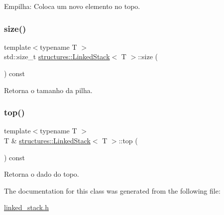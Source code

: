 Empilha\+: Coloca um novo elemento no topo. 

\mbox{\label{classstructures_1_1LinkedStack_ae1ca6a5a9b837471863f1c8bb23cfe1d}} 
\subsubsection{\texorpdfstring{size()}{size()}}
{\footnotesize\ttfamily template$<$typename T $>$ \\
std\+::size\+\_\+t \hyperlink{classstructures_1_1LinkedStack}{structures\+::\+Linked\+Stack}$<$ T $>$\+::size (\begin{DoxyParamCaption}{ }\end{DoxyParamCaption}) const}



Retorna o tamanho da pilha. 

\mbox{\label{classstructures_1_1LinkedStack_a14ab6e3507dd1206a87bba8c57e1733f}} 
\subsubsection{\texorpdfstring{top()}{top()}}
{\footnotesize\ttfamily template$<$typename T $>$ \\
T \& \hyperlink{classstructures_1_1LinkedStack}{structures\+::\+Linked\+Stack}$<$ T $>$\+::top (\begin{DoxyParamCaption}{ }\end{DoxyParamCaption}) const}



Retorna o dado do topo. 



The documentation for this class was generated from the following file\+:\begin{DoxyCompactItemize}
\item 
\hyperlink{linked__stack_8h}{linked\+\_\+stack.\+h}\end{DoxyCompactItemize}
